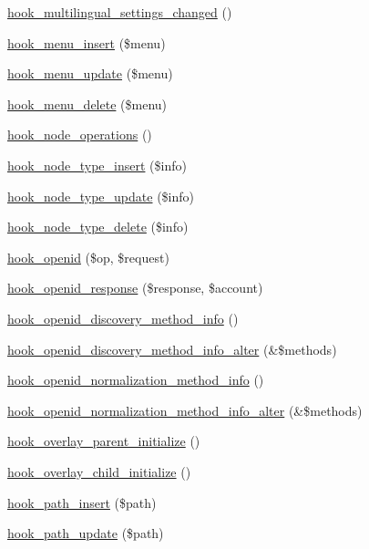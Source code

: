 \begin{DoxyCompactItemize}
\hyperlink{group__hooks_ga87a996b741bb1787b2451a2b842e20e8}{hook\_\-multilingual\_\-settings\_\-changed} ()
\item 
\hyperlink{group__hooks_ga8459a7c61564db3b5ccd53d39ada1555}{hook\_\-menu\_\-insert} (\$menu)
\item 
\hyperlink{group__hooks_ga21331911abfc25de5921af04a76a0921}{hook\_\-menu\_\-update} (\$menu)
\item 
\hyperlink{group__hooks_gaef8c43d600c4efbae913dc3841a93199}{hook\_\-menu\_\-delete} (\$menu)
\item 
\hyperlink{group__hooks_gadedee7943c08aeed54ea520c34471a28}{hook\_\-node\_\-operations} ()
\item 
\hyperlink{group__hooks_ga8941b418846350a7edbd67ac388a5dfb}{hook\_\-node\_\-type\_\-insert} (\$info)
\item 
\hyperlink{group__hooks_ga7518f336bfbd131259f520fcd45ba710}{hook\_\-node\_\-type\_\-update} (\$info)
\item 
\hyperlink{group__hooks_ga35ae5b1a494322b02d03ae00a98ac77b}{hook\_\-node\_\-type\_\-delete} (\$info)
\item 
\hyperlink{group__hooks_ga965f1ea7c6181118bd6d417c0f6db530}{hook\_\-openid} (\$op, \$request)
\item 
\hyperlink{group__hooks_gabc9e3b65c80d0d90001a8eebec8b5464}{hook\_\-openid\_\-response} (\$response, \$account)
\item 
\hyperlink{group__hooks_gaec6cbfdd913d8ba670c991b87bbf9676}{hook\_\-openid\_\-discovery\_\-method\_\-info} ()
\item 
\hyperlink{group__hooks_ga0b118d8fd00181113e6925c08c9dfb91}{hook\_\-openid\_\-discovery\_\-method\_\-info\_\-alter} (\&\$methods)
\item 
\hyperlink{group__hooks_ga53b4878d46aae5aea7de146ab543c585}{hook\_\-openid\_\-normalization\_\-method\_\-info} ()
\item 
\hyperlink{group__hooks_ga5600b490e79b0dd8bfff68558df53370}{hook\_\-openid\_\-normalization\_\-method\_\-info\_\-alter} (\&\$methods)
\item 
\hyperlink{group__hooks_ga4f7d60aad2768e7b8fac11839ea9b874}{hook\_\-overlay\_\-parent\_\-initialize} ()
\item 
\hyperlink{group__hooks_ga7bf562d101128af70a3eff0a0364342b}{hook\_\-overlay\_\-child\_\-initialize} ()
\item 
\hyperlink{group__hooks_gaa0decf43e13f49d88850786b00290d97}{hook\_\-path\_\-insert} (\$path)
\item 
\hyperlink{group__hooks_ga317c17e152ebb4fc477bb8bfe9294960}{hook\_\-path\_\-update} (\$path)

\end{DoxyCompactItemize}
